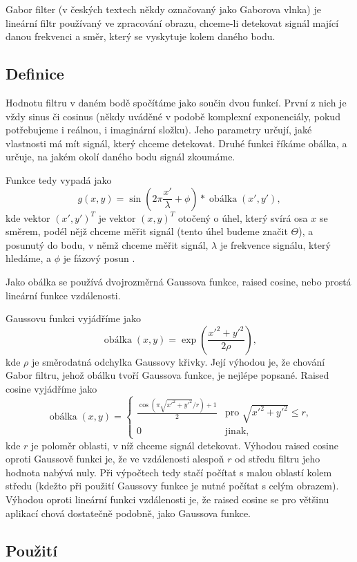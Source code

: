 Gabor filter (v českých textech někdy označovaný jako Gaborova vlnka) je
lineární filtr používaný ve zpracování obrazu, chceme-li detekovat signál
mající danou frekvenci a směr, který se vyskytuje kolem daného bodu.

\subsection{Definice}

Hodnotu filtru v daném bodě spočítáme jako součin dvou funkcí. První z nich je
vždy sinus či cosinus (někdy uváděné v podobě komplexní exponenciály, pokud
potřebujeme i reálnou, i imaginární složku). Jeho parametry určují, jaké
vlastnosti má mít signál, který chceme detekovat. Druhé funkci říkáme obálka, a
určuje, na jakém okolí daného bodu signál zkoumáme.

Funkce tedy vypadá jako $$g(x,y) =
\sin\left(2\pi\frac{x'}{\lambda}+\phi\right)*\operatorname{obálka}(x',y'),$$
kde vektor $(x',y')^T$ je vektor $(x,y)^T$ otočený o úhel, který svírá osa $x$
se směrem, podél nějž chceme měřit signál (tento úhel budeme značit $\Theta$),
a posunutý do bodu, v němž chceme měřit signál, $\lambda$ je frekvence signálu,
který hledáme, a $\phi$ je fázový posun \citep{GaborPatch}. 

Jako obálka se používá dvojrozměrná Gaussova funkce, raised cosine, nebo prostá
lineární funkce vzdálenosti. 

Gaussovu funkci vyjádříme jako $$ \operatorname{obálka}(x,y) =
\exp\left(\frac{x'^2 + y'^2}{2\rho}\right),$$ kde $\rho$ je směrodatná odchylka
Gaussovy křivky. Její výhodou je, že chování Gabor filtru, jehož obálku tvoří
Gaussova funkce, je nejlépe popsané. Raised cosine vyjádříme jako 
$$
\operatorname{obálka}(x,y)=
\begin{cases}
 \frac{\cos(\pi\sqrt{x'^2+y'^2}/r)+1}2 &\text{pro $\sqrt{x'^2+y'^2}\leq r$,}\\[1ex]
 0 &\text{jinak,}
\end{cases}
$$ kde $r$ je poloměr oblasti, v níž chceme signál detekovat. Výhodou raised
cosine oproti Gaussově funkci je, že ve vzdálenosti alespoň $r$ od středu
filtru jeho hodnota nabývá nuly. Při výpočtech tedy stačí počítat s malou
oblastí kolem středu (kdežto při použití Gaussovy funkce je nutné počítat s
celým obrazem). Výhodou oproti lineární funkci vzdálenosti je, že raised cosine
se pro většinu aplikací chová dostatečně podobně, jako Gaussova funkce.

\subsection{Použití}

